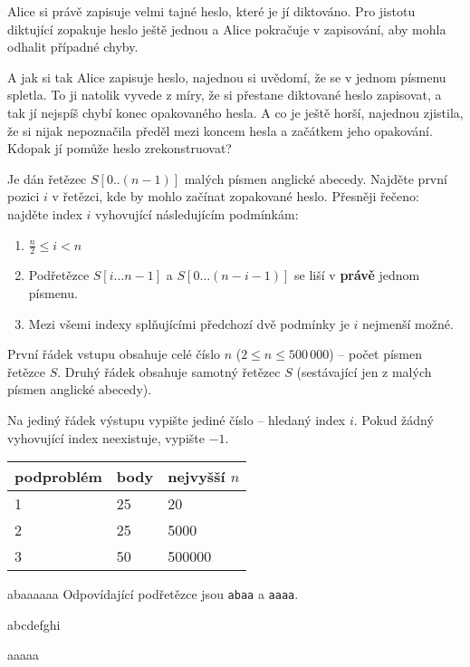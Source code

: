 
\usepackage[czech]{babel}





Alice si právě zapisuje velmi tajné heslo, které je jí diktováno.
Pro jistotu diktující zopakuje heslo ještě jednou a Alice pokračuje v zapisování,
aby mohla odhalit případné chyby.

A jak si tak Alice zapisuje heslo, najednou si uvědomí, že se v jednom písmenu spletla.
To ji natolik vyvede z míry, že si přestane diktované heslo zapisovat, a tak jí nejspíš chybí konec opakovaného hesla.
A co je ještě horší, najednou zjistila, že si nijak nepoznačila předěl mezi
koncem hesla a začátkem jeho opakování. Kdopak jí pomůže heslo zrekonstruovat?


Je dán řetězec $S[0..(n-1)]$ malých písmen anglické abecedy.
Najděte první pozici $i$ v řetězci, kde by mohlo začínat zopakované heslo.
Přesněji řečeno: najděte index $i$ vyhovující následujícím podmínkám:

\begin{enumerate}
    \item $\frac{n}{2} \leq i < n$
    \item Podřetězce $S[i\ldots n-1]$ a $S[0\ldots (n - i - 1)]$ se liší v \textbf{právě}
	jednom písmenu.
    \item Mezi všemi indexy splňujícími předchozí dvě podmínky je $i$ nejmenší možné.
\end{enumerate}


První řádek vstupu obsahuje celé číslo $n$ ($2 \leq n \leq 500\,000$) -- počet písmen řetězce $S$.
Druhý řádek obsahuje samotný řetězec $S$ (sestávající jen z malých písmen anglické abecedy).


Na jediný řádek výstupu vypište jediné číslo -- hledaný index $i$.
Pokud žádný vyhovující index neexistuje, vypište $-1$.


\centering
\begin{tabular}{|l|l|l|}
\hline
podproblém & body & nejvyšší $n$  \\ \hline
1       & 25     & 20           \\ \hline
2       & 25     & 5000         \\ \hline
3       & 50     & 500000       \\ \hline
\end{tabular}




abaaaaaa
\sampleCOMMENT
Odpovídající podřetězce jsou \texttt{abaa} a \texttt{aaaa}.
\sampleEND


\bigskip


abcdefghi
\sampleEND

\bigskip

aaaaa
\sampleEND


